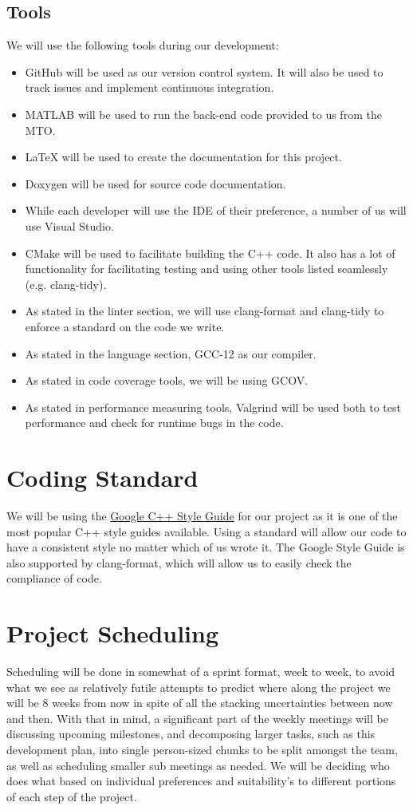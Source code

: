 \documentclass{article}
\begin{document}
\subsection{Tools}
We will use the following tools during our development:
\begin{itemize}
	\item GitHub will be used as our version control system. It will also be used to track issues and implement continuous integration.
	\item MATLAB will be used to run the back-end code provided to us from the MTO.
	\item LaTeX will be used to create the documentation for this project.
	\item Doxygen will be used for source code documentation.
	\item While each developer will use the IDE of their preference, a number of us will use Visual Studio.
	\item CMake will be used to facilitate building the C++ code. It also has a lot of functionality for facilitating testing and using other tools listed seamlessly (e.g. clang-tidy).
	\item As stated in the linter section, we will use clang-format and clang-tidy to enforce a standard on the code we write.
	\item As stated in the language section, GCC-12 as our compiler.
	\item As stated in code coverage tools, we will be using GCOV.
	\item As stated in performance measuring tools, Valgrind will be used both to test performance and check for runtime bugs in the code.
\end{itemize}

\section{Coding Standard}
We will be using the \href{https://google.github.io/styleguide/cppguide.html}{Google C++ Style Guide} for our project as it is one of the most popular C++ style guides available. Using a standard will allow our code to have a consistent style no matter which of us wrote it.
The Google Style Guide is also supported by clang-format, which will allow us to easily check the compliance of code.

\section{Project Scheduling}
	Scheduling will be done in somewhat of a sprint format, week to week, to avoid what we see as relatively futile attempts to predict where along the project we will be 8 weeks
from now in spite of all the stacking uncertainties between now and then. With that in mind, a significant part of the weekly meetings will be discussing upcoming milestones,
and decomposing larger tasks, such as this development plan, into single person-sized chunks to be split amongst the team, as well as scheduling smaller sub meetings as needed.
We will be deciding who does what based on individual preferences and suitability’s to different portions of each step of the project.\\
\end{document}
